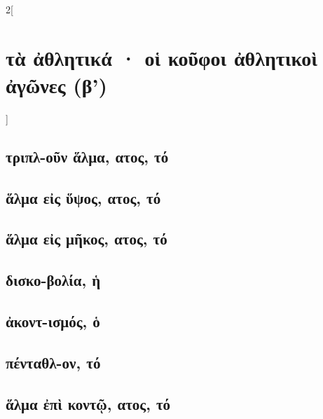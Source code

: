 \documentclass{book}
\begin{document}
\begin{multicols}{2}[\section{τὰ ἀθλητικά · οἱ κοῦφοι ἀθλητικοὶ ἀγῶνες (β')}]
{\renewcommand \thesubsection {\thesection} }
\subsection{τριπλ-οῦν ἅλμα, ατος, τό}
\subsection{ἅλμα εἰς ὕψος, ατος, τό}
\subsection{ἅλμα εἰς μῆκος, ατος, τό}
\subsection{δισκο-βολία, ἡ}             
\subsection{ἀκοντ-ισμός, ὁ}             
\subsection{πένταθλ-ον, τό}
\subsection{ἅλμα ἐπὶ κοντῷ, ατος, τό}
~
\end{multicols}
\newpage 
\end{document}
